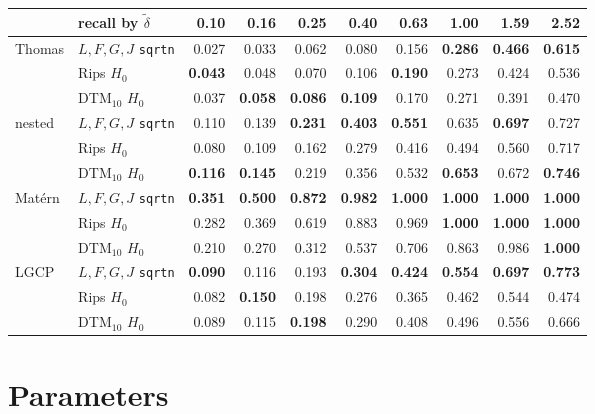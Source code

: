 \documentclass[11pt]{article}
\newcommand{\dt}{\tilde\delta}
\begin{document}
\smallskip
\begin{tabular}{@{}llrrrrrrrr@{}}
\toprule
 & recall by $\dt$ & 0.10 & 0.16 & 0.25 & 0.40 & 0.63 & 1.00 & 1.59 & 2.52 \\
\midrule
Thomas   & $L,F,G,J$ \texttt{sqrtn} & 0.027 & 0.033 & 0.062 & 0.080 & 0.156 & \textbf{0.286} & \textbf{0.466} & \textbf{0.615} \\
         & Rips $H_0$               & \textbf{0.043} & 0.048 & 0.070 & 0.106 & \textbf{0.190} & 0.273 & 0.424 & 0.536 \\
         & DTM$_{10}$ $H_0$         & 0.037 & \textbf{0.058} & \textbf{0.086} & \textbf{0.109} & 0.170 & 0.271 & 0.391 & 0.470 \\
\addlinespace
nested   & $L,F,G,J$ \texttt{sqrtn} & 0.110 & 0.139 & \textbf{0.231} & \textbf{0.403} & \textbf{0.551} & 0.635 & \textbf{0.697} & 0.727 \\
         & Rips $H_0$               & 0.080 & 0.109 & 0.162 & 0.279 & 0.416 & 0.494 & 0.560 & 0.717 \\
         & DTM$_{10}$ $H_0$         & \textbf{0.116} & \textbf{0.145} & 0.219 & 0.356 & 0.532 & \textbf{0.653} & 0.672 & \textbf{0.746} \\
\addlinespace
Mat\'ern & $L,F,G,J$ \texttt{sqrtn} & \textbf{0.351} & \textbf{0.500} & \textbf{0.872} & \textbf{0.982} & \textbf{1.000} & \textbf{1.000} & \textbf{1.000} & \textbf{1.000} \\
         & Rips $H_0$               & 0.282 & 0.369 & 0.619 & 0.883 & 0.969 & \textbf{1.000} & \textbf{1.000} & \textbf{1.000} \\
         & DTM$_{10}$ $H_0$         & 0.210 & 0.270 & 0.312 & 0.537 & 0.706 & 0.863 & 0.986 & \textbf{1.000} \\
\addlinespace
LGCP     & $L,F,G,J$ \texttt{sqrtn} & \textbf{0.090} & 0.116 & 0.193 & \textbf{0.304} & \textbf{0.424} & \textbf{0.554} & \textbf{0.697} & \textbf{0.773} \\
         & Rips $H_0$               & 0.082 & \textbf{0.150} & 0.198 & 0.276 & 0.365 & 0.462 & 0.544 & 0.474 \\
         & DTM$_{10}$ $H_0$         & 0.089 & 0.115 & \textbf{0.198} & 0.290 & 0.408 & 0.496 & 0.556 & 0.666 \\
\bottomrule
\end{tabular}

\newpage
\section{Parameters}
\end{document}
